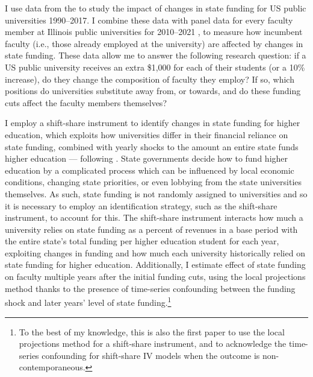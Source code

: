 I use data from the \cite{ipeds} to study the impact of changes in state funding for US public universities 1990--2017.
I combine these data with panel data for every faculty member at Illinois public universities for 2010--2021 \citep{ibhed}, to measure how incumbent faculty (i.e., those already employed at the university) are affected by changes in state funding.
These data allow me to answer the following research question: if a US public university receives an extra \$1,000 for each of their students (or a 10\% increase), do they change the composition of faculty they employ?
If so, which positions do universities substitute away from, or towards, and do these funding cuts affect the faculty members themselves?

I employ a shift-share instrument to identify changes in state funding for higher education, which exploits how universities differ in their financial reliance on state funding, combined with yearly shocks to the amount an entire state funds higher education --- following \cite{NBERw23736,NBERw27885}.
State governments decide how to fund higher education by a complicated process which can be influenced by local economic conditions, changing state priorities, or even lobbying from the state universities themselves.
As such, state funding is not randomly assigned to universities and so it is necessary to employ an identification strategy, such as the shift-share instrument, to account for this.
The shift-share instrument interacts how much a university relies on state funding as a percent of revenues in a base period with the entire state's total funding per higher education student for each year, exploiting changes in funding and how much each university historically relied on state funding for higher education.
Additionally, I estimate effect of state funding on faculty multiple years after the initial funding cuts, using the local projections method thanks to the presence of time-series confounding between the funding shock and later years' level of state funding.\footnote{
    To the best of my knowledge, this is also the first paper to use the local projections method for a shift-share instrument, and to acknowledge the time-series confounding for shift-share IV models when the outcome is non-contemporaneous.
}

